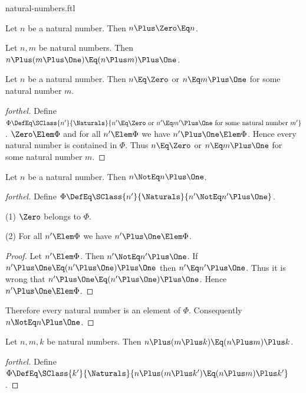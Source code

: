 \documentclass{stex}
\begin{document}
\begin{smodule}{natural-numbers.ftl}
\begin{axiom*}[forthel]
  Let $n$ be a natural number.
  Then $n \Plus \Zero \Eq n$.
\end{axiom*}

\begin{axiom*}[forthel]
  Let $n, m$ be natural numbers.
  Then $n \Plus (m \Plus \One) \Eq (n \Plus m) \Plus \One$.
\end{axiom*}

\begin{proposition*}[forthel]
  Let $n$ be a natural number.
  Then $n \Eq \Zero$ or $n \Eq m \Plus \One$ for some natural number $m$.
\end{proposition*}
\begin{proof}[forthel]
  Define $\Phi \DefEq \SClass{n'}{\Naturals}{n' \Eq \Zero\text{ or }n' \Eq m' \Plus \One\text{ for some natural number }m'}$.
  $\Zero \Elem \Phi$ and for all $n' \Elem  \Phi$ we have $n' \Plus \One \Elem \Phi$.
  Hence every natural number is contained in $\Phi$.
  Thus $n \Eq \Zero$ or $n \Eq m \Plus \One$ for some natural number $m$.
\end{proof}

\begin{proposition*}[forthel]
  Let $n$ be a natural number.
  Then $n \NotEq n \Plus \One$.
\end{proposition*}
\begin{proof}[forthel]
  Define $\Phi \DefEq \SClass{n'}{\Naturals}{n' \NotEq n' \Plus \One}$.

  (1) $\Zero$ belongs to $\Phi$.

  (2) For all $n' \Elem \Phi$ we have $n' \Plus \One \Elem \Phi$.
  \begin{proof}
    Let $n' \Elem \Phi$.
    Then $n' \NotEq n' \Plus \One$.
    If $n' \Plus \One \Eq (n' \Plus \One) \Plus \One$ then $n' \Eq n' \Plus \One$.
    Thus it is wrong that $n' \Plus \One \Eq (n' \Plus \One) \Plus \One$.
    Hence $n' \Plus \One \Elem \Phi$.
  \end{proof}

  Therefore every natural number is an element of $\Phi$.
  Consequently $n \NotEq n \Plus \One$.
\end{proof}

\begin{proposition*}[forthel]
  Let $n, m, k$ be natural numbers.
  Then $n \Plus (m \Plus k) \Eq (n \Plus m) \Plus k$.
\end{proposition*}
\begin{proof}[forthel]
  Define $\Phi \DefEq \SClass{k'}{\Naturals}{n \Plus (m \Plus k') \Eq (n \Plus m) \Plus k'}$.


\end{proof}
\end{smodule}
\end{document}
